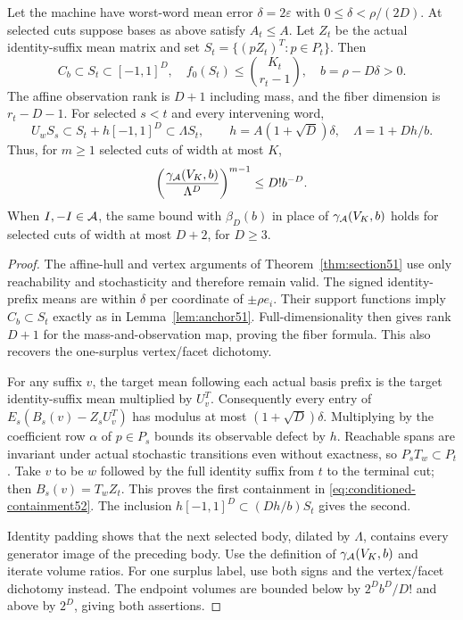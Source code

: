 \begin{theorem}
\label{thm:conditioned52}
Let the machine have worst-word mean error $\delta=2\varepsilon$
with $0\le\delta<\rho/(2D)$. At selected cuts suppose bases as above
satisfy $A_t\le A$. Let $Z_t$ be the actual identity-suffix mean
matrix and set $S_t=\{(pZ_t)^T:p\in P_t\}$. Then
\[
 C_b\subset S_t\subset[-1,1]^D,\quad
 f_0(S_t)\le\binom{K_t}{r_t-1},\quad b=\rho-D\delta>0.
\]
The affine observation rank is $D+1$ including mass, and the fiber
dimension is $r_t-D-1$. For selected $s<t$ and every intervening word,
\begin{equation}\label{eq:conditioned-containment52}
 U_w S_s\subset S_t+h[-1,1]^D\subset\Lambda S_t,
 \qquad h=A(1+\sqrt D)\delta,\quad \Lambda=1+Dh/b.
\end{equation}
Thus, for $m\ge1$ selected cuts of width at most $K$,
\begin{equation}\label{eq:conditioned-budget52}
 \left(\frac{\gamma_{\mathcal A}(V_K,b)}{\Lambda^D}\right)^{m-1}
                                  \le D!b^{-D}.
\end{equation}
When $I,-I\in\mathcal A$, the same bound with $\beta_D(b)$ in place of
$\gamma_{\mathcal A}(V_K,b)$ holds for selected cuts of width at most
$D+2$, for $D\ge3$.
\end{theorem}
\begin{proof}
The affine-hull and vertex arguments of Theorem~\ref{thm:section51}
use only reachability and stochasticity and therefore remain valid.
The signed identity-prefix means are within $\delta$ per coordinate
of $\pm\rho e_i$. Their support functions imply $C_b\subset S_t$
exactly as in Lemma~\ref{lem:anchor51}. Full-dimensionality then gives
rank $D+1$ for the mass-and-observation map, proving the fiber formula.
This also recovers the one-surplus vertex/facet dichotomy.

For any suffix $v$, the target mean following each actual basis prefix
is the target identity-suffix mean multiplied by $U_v^T$.
Consequently every entry of
$E_s(B_s(v)-Z_sU_v^T)$ has modulus at most $(1+\sqrt D)\delta$.
Multiplying by the coefficient row $\alpha$ of $p\in P_s$ bounds
its observable defect by $h$. Reachable spans are invariant under
actual stochastic transitions even without exactness, so
$P_sT_w\subset P_t$. Take $v$ to be $w$ followed by the full identity
suffix from $t$ to the terminal cut; then $B_s(v)=T_wZ_t$.
This proves the first containment in \eqref{eq:conditioned-containment52}.
The inclusion $h[-1,1]^D\subset(Dh/b)S_t$ gives the second.

Identity padding shows that the next selected body, dilated by
$\Lambda$, contains every generator image of the preceding body.
Use the definition of $\gamma_{\mathcal A}(V_K,b)$ and iterate volume
ratios. For one surplus label, use both signs and the vertex/facet
dichotomy instead. The endpoint volumes are bounded below by
$2^Db^D/D!$ and above by $2^D$, giving both assertions.
\end{proof}

